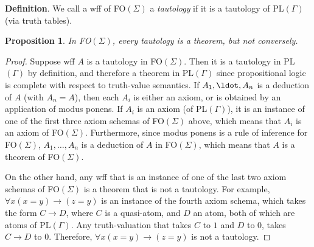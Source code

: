 \documentclass[12pt]{article}
\newtheorem{prop}{Proposition}
\begin{document}
\textbf{Definition}.  We call a wff of FO$(\Sigma)$ a \emph{tautology} if it is a tautology of PL$(\Gamma)$ (via truth tables).

\begin{prop} In FO$(\Sigma)$, every tautology is a theorem, but not conversely. \end{prop}
\begin{proof}  Suppose wff $A$ is a tautology in FO$(\Sigma)$.  Then it is a tautology in PL$(\Gamma)$ by definition, and therefore a theorem in PL$(\Gamma)$ since propositional logic is complete with respect to truth-value semantics.  If $A_1,\ldot,A_n$ is a deduction of $A$ (with $A_n=A$), then each $A_i$ is either an axiom, or is obtained by an application of modus ponens.  If $A_i$ is an axiom (of PL$(\Gamma)$), it is an instance of one of the first three axiom schemas of FO$(\Sigma)$ above, which means that $A_i$ is an axiom of FO$(\Sigma)$.  Furthermore, since modus ponens is a rule of inference for FO$(\Sigma)$, $A_1,\ldots, A_n$ is a deduction of $A$ in FO$(\Sigma)$, which means that $A$ is a theorem of FO$(\Sigma)$.

On the other hand, any wff that is an instance of one of the last two axiom schemas of FO$(\Sigma)$ is a theorem that is not a tautology.  For example, $\forall x (x=y) \to (z=y)$ is an instance of the fourth axiom schema, which takes the form $C\to D$, where $C$ is a quasi-atom, and $D$ an atom, both of which are atoms of PL$(\Gamma)$.  Any truth-valuation that takes $C$ to $1$ and $D$ to $0$, takes $C\to D$ to $0$.  Therefore, $\forall x (x=y) \to (z=y)$ is not a tautology.
\end{proof}

\end{document}
